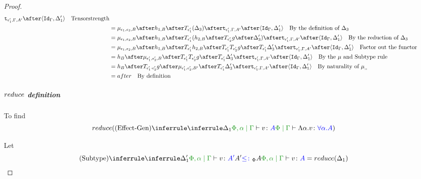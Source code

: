 \documentclass{report}
\begin{document}
\begin{framed}
\begin{proof}
{{\begin{align*}
                            \tstrength{\e_1'}{\G}{A'}\after\pr{\idg}{\D_1'}\qt{Tensorstrength}\\
                            &= \bind{\e_1}{\e_2}{B}\after 
                            h_{1, B}\after\T{\e_1'}{(\D_3)}\after
                            \tstrength{\e_1'}{\G}{A'}\after\pr{\idg}{\D_1'}\qt{By the definition of $\D_3$}\\
                            &= \bind{\e_1}{\e_2}{B}\after 
                            h_{1, B}\after\T{\e_1'}{(h_{2, B}\after\T{\e_2'}{g}\after \D_3')}\after
                            \tstrength{\e_1'}{\G}{A'}\after\pr{\idg}{\D_1'}\qt{By the reduction of $\D_3$}\\
                            &= \bind{\e_1}{\e_2}{B}\after 
                            h_{1, B}\after\T{\e_1'}{h_{2, B}}\after\T{\e_1'}{\T{\e_2'}{g}}\after \T{\e_1'}{\D_3'}\after
                            \tstrength{\e_1'}{\G}{A'}\after\pr{\idg}{\D_1'}\qt{Factor out the functor}\\
                            &= h_B\after\bind{\e_1'}{\e_2'}{B}\after\T{\e_1'}{\T{\e_2'}{g}}\after \T{\e_1'}{\D_3'}\after
                            \tstrength{\e_1'}{\G}{A'}\after\pr{\idg}{\D_1'}\qt{By the $\mu$ and Subtype rule }\\
                            & = h_B\after\T{\e_1'\dot\e_2'}{g}\after\bind{\e_1'}{\e_2'}{B'}\after \T{\e_1'}{\D_3'}\after
                            \tstrength{\e_1'}{\G}{A'}\after\pr{\idg}{\D_1'}\qt{By naturality of $\bind{}{}{}$ }\\
                            & = after \qt{By definition}
                        \end{align*}
                        }}

                \case{\vgen}
                \subparagraph{$reduce$ definition}
        
                
                To find 
                \begin{equation}
                    \reduce(\ntreeruleI{\vgen}{\treeruleI{\D_1}{\etyperelation{\P,\a}{\G}{v}{A}}}{\gpetyperelation{\elam{\a}{v}}{\all{\a}{A}}})
                \end{equation}
        
                Let
                \begin{equation}
                    \ntreeruleII{\vsubtype}{\treeruleI{\D_1'}{\etyperelation{\P,\a}{\G}{v}{A'}}}{ A'\subtypep A}{\etyperelation{\P,\a}{\G}{v}{A}} = \reduce(\D_1)
                \end{equation}
        

\end{proof}
\end{framed}
\end{document}
